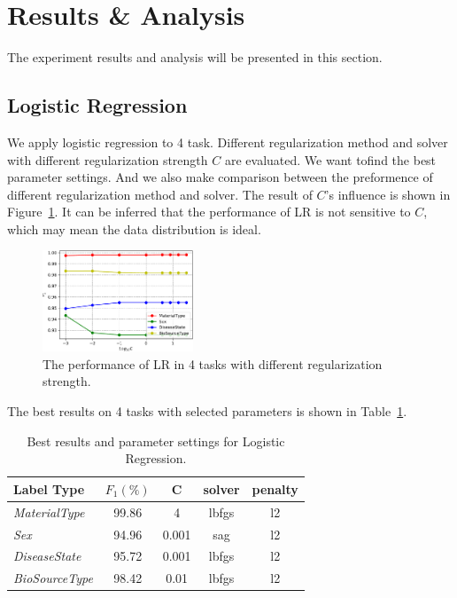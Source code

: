 \documentclass[sigconf]{acmart}
\begin{document}
\section{Results \& Analysis}
The experiment results and analysis will be presented in this section.


\subsection{Logistic Regression} 
We apply logistic regression to 4 task. Different regularization method and solver with different regularization strength $C$ are evaluated. We want tofind the best parameter settings. And we also make comparison between the preformence of different regularization method and solver. The result of $C$'s influence is shown in Figure~\ref{lr_result1}. It can be inferred that the performance of LR is not sensitive to $C$, which may mean the data distribution is ideal.

\begin{figure}[!ht]
	\centering
	\includegraphics[width=0.4\textwidth]{../figs/LR_C.pdf}
	\caption{The performance of LR in 4 tasks with different regularization strength.}
	\label{lr_result1}
	\centering
\end{figure}

The best results on 4 tasks with selected parameters is shown in Table~\ref{lr_result2}.

\begin{table}[tbp]
	\centering
	\begin{tabular}{l|cccc}
		\toprule
		{Label Type} & $F_1 (\%)$ & C &solver &penalty \\
		\midrule
		{\textit{MaterialType}}&99.86 & 4 &lbfgs & l2\\
		{\textit{Sex}}		& 94.96 & 0.001    &sag & l2 \\
		{\textit{DiseaseState}}& 95.72 & 0.001 &lbfgs & l2\\
		{\textit{BioSourceType}}& 98.42 & 0.01 &lbfgs & l2\\
		\bottomrule	
	\end{tabular}
	
	\caption{Best results and parameter settings for Logistic Regression. }
	\label{lr_result2}
\end{table}
\end{document}
